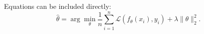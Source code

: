 Equations can be included directly:
\[
  \widehat{\theta}=\arg\min_{\theta}
  \frac{1}{n}\sum_{i=1}^{n}\mathcal{L}(f_{\theta}(x_i),y_i)
  +\lambda\lVert\theta\rVert_2^2.
\]

